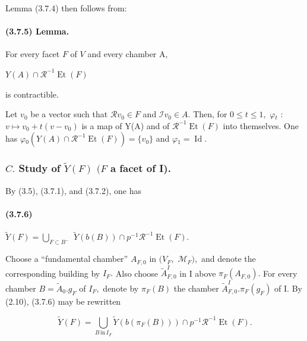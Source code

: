 \documentclass[10pt,a4paper]{article}
\begin{document}
Lemma (3.7.4) then follows from:\par

\paragraph{(3.7.5) Lemma.} For every facet \ensuremath{F} of \ensuremath{V} and every chamber A,

\ensuremath{Y(A)\cap{}\mathcal{R}^{-1}\operatorname{Et}(F)}\par

is contractible.\par

Let \ensuremath{v_0} be a vector such that \ensuremath{\mathcal{R}v_0\in{}F} and \ensuremath{\mathcal{I}v_0\in{}A.} Then, for \ensuremath{0\le{}t\le{}1,} \ensuremath{\varphi{}_t} : \ensuremath{v\longmapsto{}v_0+t(v-v_0)} is a map of Y(A) and of \ensuremath{\mathcal{R}^{-1}\operatorname{Et}(F)} into themselves. One has \ensuremath{\varphi{}_0(Y(A)\cap{}\mathcal{R}^{-1}\operatorname{Et}(F))=\{v_0\}} and \ensuremath{\varphi{}_1=\operatorname{Id}.}\par

\subsubsection*{\ensuremath{C.} Study of \ensuremath{\widetilde{Y}(F)} \ensuremath{(F} a facet of I).}

By (3.5), (3.7.1), and (3.7.2), one has\par

\paragraph{(3.7.6)} \ensuremath{\widetilde{Y}(F)=\bigcup_{F\subset{}B^{-}}} \ensuremath{\widetilde{Y}(b(B))\cap{}p^{-1}\mathcal{R}^{-1}\operatorname{Et}(F).}

Choose a ``fundamental chamber'' \ensuremath{A_{F,0}} in \ensuremath{(V_F,} \ensuremath{\mathcal{M}_F),} and denote the corresponding building by \ensuremath{I_F.} Also choose \ensuremath{\widetilde{A}^I_{F,0}} in I above \ensuremath{\pi{}_F(A_{F,0}).} For every chamber \ensuremath{B=\widetilde{A}_0.g_F} of \ensuremath{I_F,} denote by \ensuremath{\pi{}_F(B)} the chamber \ensuremath{\widetilde{A}^I_{F,0}.\pi{}_F(g_F)} of I. By (2.10), (3.7.6) may be rewritten\par

\[\widetilde{Y}(F)=\bigcup_{B\,\text{in}\,I_F}\widetilde{Y}(b(\pi_F(B)))\cap p^{-1}\mathcal{R}^{-1}\operatorname{Et}(F).\]
\end{document}
